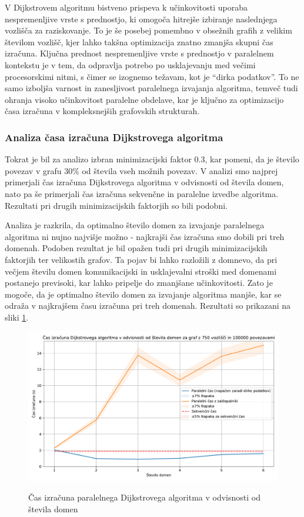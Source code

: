 \documentclass[mat1, tisk]{fmfdelo}
\begin{document}
V Dijkstrovem algoritmu bistveno prispeva k učinkovitosti uporaba nespremenljive vrste s prednostjo, ki omogoča
hitrejše izbiranje naslednjega vozlišča za raziskovanje. To je še posebej pomembno v obsežnih grafih z velikim številom
vozlišč, kjer lahko takšna optimizacija znatno zmanjša skupni čas izračuna. Ključna prednost nespremenljive vrste s
prednostjo v paralelnem kontekstu je v tem, da odpravlja potrebo po usklajevanju med večimi procesorskimi nitmi,
s čimer se izognemo težavam, kot je ``dirka podatkov''. To ne samo izboljša varnost in zanesljivost paralelnega izvajanja
algoritma, temveč tudi ohranja visoko učinkovitost paralelne obdelave, kar je ključno za optimizacijo časa izračuna v
kompleksnejših grafovskih strukturah.

\subsubsection{Analiza časa izračuna Dijkstrovega algoritma}

Tokrat je bil za analizo izbran minimizacijski faktor 0.3, kar pomeni, da je število povezav v grafu 30\% od števila vseh
možnih povezav. V analizi smo najprej primerjali čas izračuna Dijkstrovega algoritma v odvisnosti od števila domen,
nato pa še primerjali čas izračuna sekvenčne in paralelne izvedbe algoritma. Rezultati pri drugih minimizacijskih
faktorjih so bili podobni.

Analiza je razkrila, da optimalno število domen za izvajanje paralelnega algoritma ni nujno najvišje možno - najkrajši
čas izračuna smo dobili pri treh domenah. Podoben rezultat je bil opažen tudi pri drugih minimizacijskih faktorjih ter velikostih grafov.
Ta pojav bi lahko razložili z domnevo, da pri večjem številu domen komunikacijski in usklajevalni stroški med domenami
postanejo previsoki, kar lahko pripelje do zmanjšane učinkovitosti. Zato je mogoče, da je optimalno število domen za
izvajanje algoritma manjše, kar se odraža v najkrajšem času izračuna pri treh domenah. 
Rezultati so prikazani na sliki \ref{fig:dijkstra_calculation_time_by_num_domains}.

\begin{figure}[h!]
  \centering
  \caption{Čas izračuna paralelnega Dijkstrovega algoritma v odvisnosti od števila domen}
  \includegraphics[width=15cm]{slike/dijkstra_v_odvisnosti_od_stevila_domen.pdf}
  \label{fig:dijkstra_calculation_time_by_num_domains}
\end{figure}
\end{document}
